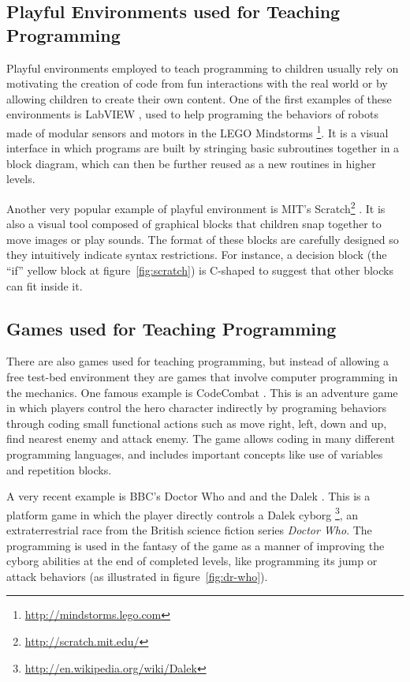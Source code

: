 \documentclass{sigchi}
\begin{document}
    \subsection{Playful Environments used for Teaching Programming}
        Playful environments employed to teach programming to children usually
        rely on motivating the creation of code from fun interactions with the
        real world or by allowing children to create their own content. One of
        the first examples of these environments is LabVIEW \cite{Erwin2000},
        used to help programing the behaviors of robots made of modular sensors
        and motors in the LEGO Mindstorms
        \footnote{\url{http://mindstorms.lego.com}}. It is a visual interface in
        which programs are built by stringing basic subroutines together in a
        block diagram, which can then be further reused as a new routines in
        higher levels.

        Another very popular example of playful environment is MIT's
        Scratch\footnote{\url{http://scratch.mit.edu/}} \cite{Resnick2009}. It
        is also a visual tool composed of graphical blocks that children snap
        together to move images or play sounds. The format of these blocks are
        carefully designed so they intuitively indicate syntax restrictions. For
        instance, a decision block (the ``if'' yellow block at
        figure~\ref{fig:scratch}) is C-shaped to suggest that other blocks can
        fit inside it.

    \subsection{Games used for Teaching Programming}
        There are also games used for teaching programming, but instead of
        allowing a free test-bed environment they are games that involve
        computer programming in the mechanics. One famous example is CodeCombat
        \cite{Saines2013}. This is an adventure game in which players control
        the hero character indirectly by programing behaviors through coding
        small functional actions such as move right, left, down and up, find
        nearest enemy and attack enemy. The game allows coding in many different
        programming languages, and includes important concepts like use of
        variables and repetition blocks.

        A very recent example is BBC's Doctor Who and and the Dalek
        \cite{BBC2014}. This is a platform game in which the player directly
        controls a Dalek cyborg
        \footnote{\url{http://en.wikipedia.org/wiki/Dalek}}, an extraterrestrial
        race from the British science fiction series \textit{Doctor Who}. The
        programming is used in the fantasy of the game as a manner of improving
        the cyborg abilities at the end of completed levels, like programming
        its jump or attack behaviors (as illustrated in
        figure~\ref{fig:dr-who}).
\end{document}
